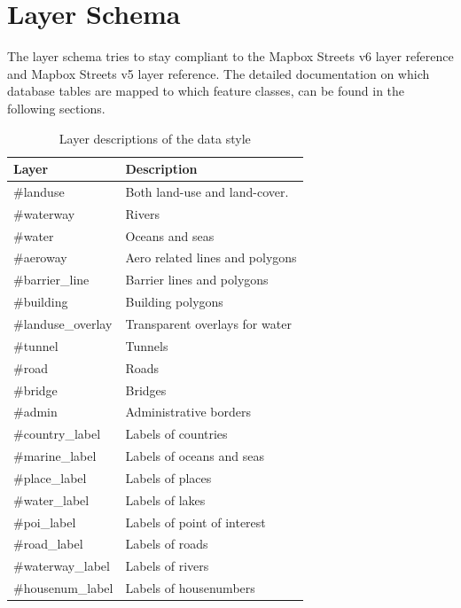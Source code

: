\newpage
\section{Layer Schema}\label{layer-schema}

The layer schema tries to stay compliant to the Mapbox Streets v6 layer reference
\cite{22_mapbox.com_2015} and Mapbox Streets v5 layer reference\cite{23_mapbox.com_2015}.
The detailed documentation on which database tables are mapped to which feature classes, can be found in the following sections.

\begin{table}[H]
\centering
    \begin{tabular}{ll}
    \hline
     Layer             & Description                     \\
    \hline
    \#landuse          & Both land-use and land-cover.   \\
    \#waterway         & Rivers                          \\
    \#water            & Oceans and seas                 \\
    \#aeroway          & Aero related lines and polygons \\
    \#barrier\_line    & Barrier lines and polygons      \\
    \#building         & Building polygons               \\
    \#landuse\_overlay & Transparent overlays for water  \\
    \#tunnel           & Tunnels                         \\
    \#road             & Roads                           \\
    \#bridge           & Bridges                         \\
    \#admin            & Administrative borders          \\
    \#country\_label   & Labels of countries             \\
    \#marine\_label    & Labels of oceans and seas       \\
    \#place\_label     & Labels of places                \\
    \#water\_label     & Labels of lakes                 \\
    \#poi\_label       & Labels of point of interest     \\
    \#road\_label      & Labels of roads                 \\
    \#waterway\_label  & Labels of rivers                \\
    \#housenum\_label  & Labels of housenumbers          \\
    \end{tabular}
    \caption{Layer descriptions of the data style}
\end{table}


